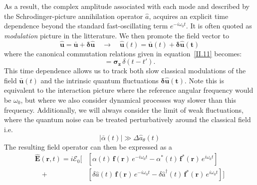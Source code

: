 As a result, the complex amplitude associated with each mode and described by the Schrodinger-picture annihilation operator $\hat{a}$, acquires an explicit time dependence beyond the standard fast-oscillating term $e^{-i\omega_0 t}$. It is often quoted as \textit{modulation} picture in the litterature. We then promote the field vector to 
\begin{equation}
\mathbf{\hat{u}}= \mathbf{\bar{u}} + \mathbf{\delta \hat{u}} \quad \rightarrow \quad
  \mathbf{\hat{u}}(t)=
 \mathbf{\bar{u}}(t) + \mathbf{\delta \hat{u}(t)}
\end{equation}
where the canonical commutation relations given in equation~\eqref{II.11} becomes:
\begin{equation}
  [\delta\mathbf{\hat{u}}(t), \delta \mathbf{\hat{u}}(t')^{\dagger}] = \mathbf{\sigma_z} \, \delta (t-t').
\end{equation}
This time dependence allows us to track both slow classical modulations of the field $\mathbf{\bar{u}}(t)$ and the intrinsic quantum fluctuations $\mathbf{\delta \hat{u}(t)}$. Note this is equivalent to the interaction picture where the reference angular frequency would be $\omega_0$, but where we also consider dynamical processes way slower than this frequency. Additionally, we will always consider the limit of weak fluctuations, where the quantum noise can be treated perturbatively around the classical field i.e. 
\[
|\bar{\alpha}(t)| \gg \Delta \hat a_\theta(t)
\]
The resulting field operator can then be expressed as a 
\begin{equation}
\begin{aligned}
\hat{\mathbf{E}}(\mathbf{r}, t) 
=i  \mathcal{E}_0 \bigg[ & \left[ \alpha(t)\, \mathbf{f}(\mathbf{r})\, e^{-i \omega_0 t} 
- \alpha^*(t)\, \mathbf{f}^*(\mathbf{r})\, e^{i \omega_0 t} \right] \\
\quad +  &\left[ \delta \hat{a}(t)\, \mathbf{f}(\mathbf{r})\, e^{-i \omega_0 t}
- \delta \hat{a}^\dagger(t)\, \mathbf{f}^*(\mathbf{r})\, e^{i \omega_0 t} \right] \bigg]
\end{aligned}
\end{equation} 

